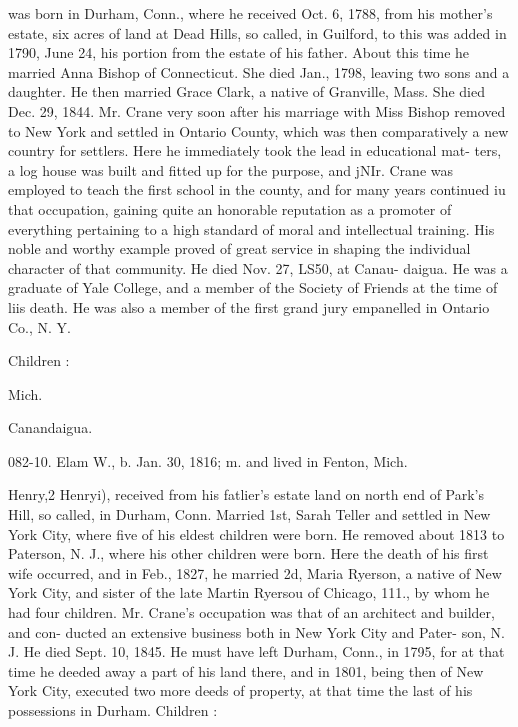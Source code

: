 \documentclass[oneside]{book}
\begin{document}
was born in Durham, Conn., where he received Oct. 6, 1788, from 
his mother's estate, six acres of land at Dead Hills, so called, in 
Guilford, to this was added in 1790, June 24, his portion from 
the estate of his father. About this time he married Anna Bishop 
of Connecticut. She died Jan., 1798, leaving two sons and a 
daughter. He then married Grace Clark, a native of Granville, 
Mass. She died Dec. 29, 1844. Mr. Crane very soon after his 
marriage with Miss Bishop removed to New York and settled in 
Ontario County, which was then comparatively a new country for 
settlers. Here he immediately took the lead in educational mat- 
ters, a log house was built and fitted up for the purpose, and jNIr. 
Crane was employed to teach the first school in the county, and 
for many years continued iu that occupation, gaining quite an 
honorable reputation as a promoter of everything pertaining to a 
high standard of moral and intellectual training. His noble and 
worthy example proved of great service in shaping the individual 
character of that community. He died Nov. 27, LS50, at Canau- 
daigua. He was a graduate of Yale College, and a member of 
the Society of Friends at the time of liis death. He was also a 
member of the first grand jury empanelled in Ontario Co., N. Y. 

Children : 


Mich. 


Canandaigua. 









082-10. Elam W., b. Jan. 30, 1816; m. and lived in Fenton, Mich. 



Henry,2 Henryi), received from his fatlier's estate land on north 
end of Park's Hill, so called, in Durham, Conn. Married 1st, 
Sarah Teller and settled in New York City, where five of his 
eldest children were born. He removed about 1813 to Paterson, 
N. J., where his other children were born. Here the death of 
his first wife occurred, and in Feb., 1827, he married 2d, Maria 
Ryerson, a native of New York City, and sister of the late Martin 
Ryersou of Chicago, 111., by whom he had four children. Mr. 
Crane's occupation was that of an architect and builder, and con- 
ducted an extensive business both in New York City and Pater- 
son, N. J. He died Sept. 10, 1845. He must have left Durham, 
Conn., in 1795, for at that time he deeded away a part of his land 
there, and in 1801, being then of New York City, executed two 
more deeds of property, at that time the last of his possessions in 
Durham. Children : 
\end{document}

